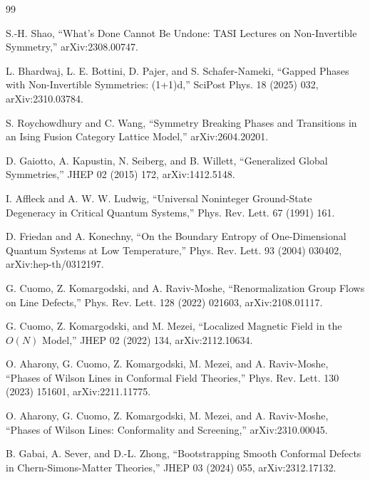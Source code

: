 \documentclass[11pt]{article}
\begin{document}
\begin{thebibliography}{99}

S.-H. Shao, ``What's Done Cannot Be Undone: TASI Lectures on Non-Invertible Symmetry,'' arXiv:2308.00747.


L. Bhardwaj, L. E. Bottini, D. Pajer, and S. Schafer-Nameki, ``Gapped Phases with Non-Invertible Symmetries: (1+1)d,'' SciPost Phys. 18 (2025) 032, arXiv:2310.03784.

S. Roychowdhury and C. Wang, ``Symmetry Breaking Phases and Transitions in an Ising Fusion Category Lattice Model,'' arXiv:2604.20201.

D. Gaiotto, A. Kapustin, N. Seiberg, and B. Willett, ``Generalized Global Symmetries,'' JHEP 02 (2015) 172, arXiv:1412.5148.

I. Affleck and A. W. W. Ludwig, ``Universal Noninteger Ground-State Degeneracy in Critical Quantum Systems,'' Phys. Rev. Lett. 67 (1991) 161.

D. Friedan and A. Konechny, ``On the Boundary Entropy of One-Dimensional Quantum Systems at Low Temperature,'' Phys. Rev. Lett. 93 (2004) 030402, arXiv:hep-th/0312197.

G. Cuomo, Z. Komargodski, and A. Raviv-Moshe, ``Renormalization Group Flows on Line Defects,'' Phys. Rev. Lett. 128 (2022) 021603, arXiv:2108.01117.

G. Cuomo, Z. Komargodski, and M. Mezei, ``Localized Magnetic Field in the $O(N)$ Model,'' JHEP 02 (2022) 134, arXiv:2112.10634.

O. Aharony, G. Cuomo, Z. Komargodski, M. Mezei, and A. Raviv-Moshe, ``Phases of Wilson Lines in Conformal Field Theories,'' Phys. Rev. Lett. 130 (2023) 151601, arXiv:2211.11775.

O. Aharony, G. Cuomo, Z. Komargodski, M. Mezei, and A. Raviv-Moshe, ``Phases of Wilson Lines: Conformality and Screening,'' arXiv:2310.00045.

B. Gabai, A. Sever, and D.-L. Zhong, ``Bootstrapping Smooth Conformal Defects in Chern-Simons-Matter Theories,'' JHEP 03 (2024) 055, arXiv:2312.17132.

\end{thebibliography}
\end{document}
